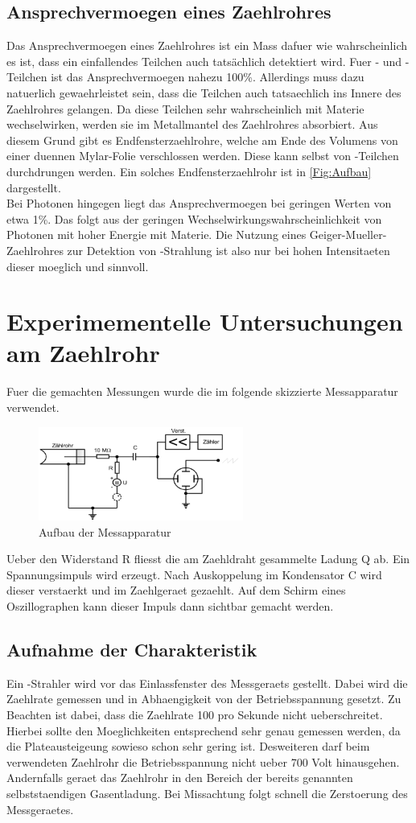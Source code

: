 \documentclass[titlepage=firstcover, captions=tableheading]{scrartcl}
\begin{document}
\subsection{Ansprechvermoegen eines Zaehlrohres}
Das Ansprechvermoegen eines Zaehlrohres ist ein Mass dafuer wie wahrscheinlich es ist, dass ein einfallendes Teilchen auch tatsächlich detektiert wird. Fuer \alpha- und \beta-Teilchen ist das Ansprechvermoegen nahezu 100\%. Allerdings muss dazu natuerlich gewaehrleistet sein, dass die Teilchen auch tatsaechlich ins Innere des Zaehlrohres gelangen. Da diese Teilchen sehr wahrscheinlich mit Materie wechselwirken, werden sie im Metallmantel des Zaehlrohres absorbiert. Aus diesem Grund gibt es Endfensterzaehlrohre, welche am Ende des Volumens von einer duennen Mylar-Folie verschlossen werden. Diese kann selbst von \alpha-Teilchen durchdrungen werden. Ein solches Endfensterzaehlrohr ist in \ref{Fig:Aufbau} dargestellt.\\
Bei Photonen hingegen liegt das Ansprechvermoegen bei geringen Werten von etwa 1\%. Das folgt aus der geringen Wechselwirkungswahrscheinlichkeit von Photonen mit hoher Energie mit Materie. Die Nutzung eines Geiger-Mueller-Zaehlrohres zur Detektion von \gamma-Strahlung ist also nur bei hohen Intensitaeten dieser moeglich und sinnvoll. 
\section{Experimementelle Untersuchungen am Zaehlrohr}
Fuer die gemachten Messungen wurde die im folgende skizzierte Messapparatur verwendet.
\begin{figure}[H]
    \centering
    \includegraphics[width=0.6\textwidth]{"Apparatur_Geiger.png"}
    \caption{Aufbau der Messapparatur}
    \label{Fig:Apparatur}
\end{figure}
\noindent Ueber den Widerstand R fliesst die am Zaehldraht gesammelte Ladung Q ab. Ein Spannungsimpuls wird erzeugt. Nach Auskoppelung im Kondensator C wird dieser verstaerkt und im Zaehlgeraet gezaehlt. Auf dem Schirm eines Oszillographen kann dieser Impuls dann sichtbar gemacht werden.
\subsection{Aufnahme der Charakteristik}
Ein \beta-Strahler wird vor das Einlassfenster des Messgeraets gestellt. Dabei wird die Zaehlrate gemessen und in Abhaengigkeit von der Betriebsspannung gesetzt. Zu Beachten ist dabei, dass die Zaehlrate 100 pro Sekunde nicht ueberschreitet. Hierbei sollte den Moeglichkeiten entsprechend sehr genau gemessen werden, da die Plateausteigeung sowieso schon sehr gering ist. Desweiteren darf beim verwendeten Zaehlrohr die Betriebsspannung nicht ueber 700 Volt hinausgehen. Andernfalls geraet das Zaehlrohr in den Bereich der bereits genannten selbststaendigen Gasentladung. Bei Missachtung folgt schnell die Zerstoerung des Messgeraetes. 
\end{document}
